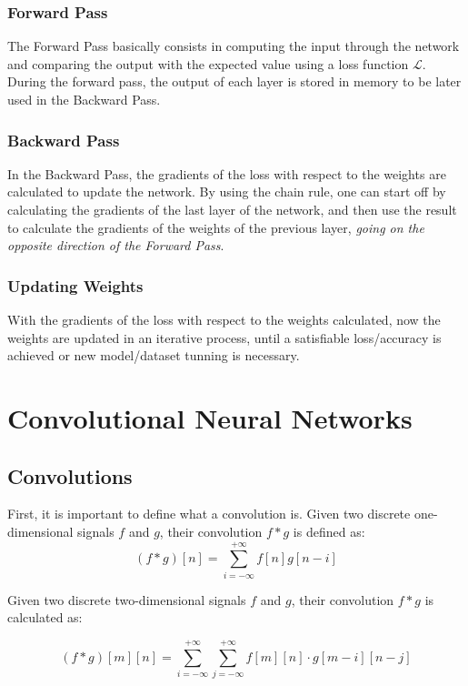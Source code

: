 \subsubsection{Forward Pass}

The Forward Pass basically consists in computing the input through the network and comparing the output with the expected value using a loss function \(\mathcal{L}\).
During the forward pass, the output of each layer is stored in memory to be later used in the Backward Pass.

\subsubsection{Backward Pass}

In the Backward Pass, the gradients of the loss with respect to the weights are calculated to update the network. 
By using the chain rule, one can start off by calculating the gradients of the last layer of the network, and then use the result to calculate the gradients of the weights of the previous layer, \emph{going on the opposite direction of the Forward Pass}.

\subsubsection{Updating Weights}

With the gradients of the loss with respect to the weights calculated, now the weights are updated in an iterative process, until a satisfiable loss/accuracy is achieved or new model/dataset tunning is necessary. 

\section{Convolutional Neural Networks}
\label{sec:convolutions}
\subsection{Convolutions}
First, it is important to define what a convolution is. Given two discrete one-dimensional signals \(f\) and \(g\), their convolution \(f * g\) is defined as:
\[
(f*g)[n] = \sum_{i=-\infty}^{+\infty} f[n] g[n-i]
\]

Given two discrete two-dimensional signals \(f\) and \(g\), their convolution \(f * g\) is calculated as:

\[
(f*g)[m][n] = \sum_{i=-\infty}^{+\infty} \sum_{j=-\infty}^{+\infty} f[m][n] \cdot g[m-i][n-j]
\]

